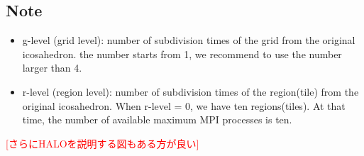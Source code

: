 \subsection{Note}
 \begin{itemize}
   \item g-level (grid level): number of subdivision times of the grid from the original icosahedron.
         the number starts from 1, we recommend to use the number larger than 4.
   \item r-level (region level): number of subdivision times of the region(tile)
         from the original icosahedron. When r-level = 0, we have ten regions(tiles).
         At that time, the number of available maximum MPI processes is ten.
 \end{itemize}

\textcolor{red}{[さらにHALOを説明する図もある方が良い]}

